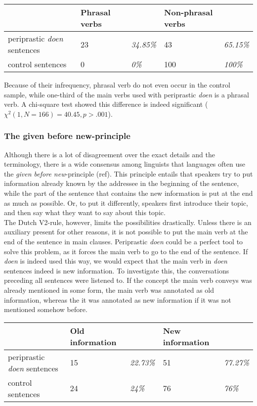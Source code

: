 \documentclass[12pt]{article}
\begin{document}

\begin{table}[h]
\begin{tabular}{|l|ll|ll|}
\hline
&Phrasal verbs&&Non-phrasal verbs&\\
\hline
periprastic \emph{doen} sentences	&23 	& \emph{34.85\%}	&43		 &\emph{65.15\%}\\
control sentences					&0		& \emph{0\%}		&100	 &\emph{100\%}\\
\hline
\end{tabular}
\end{table}

Because of their infrequency, phrasal verb do not even occur in the control sample, while one-third of the main verbs used with periprastic \emph{doen} is a phrasal verb. A chi-square test showed this difference is indeed significant ($\chi^2(1, N=166) = 40.45, p > .001$).

\subsubsection{The given before new-principle}

Although there is a lot of disagreement over the exact details and the terminology, there is a wide consensus among linguists that languages often use the \emph{given before new}-principle (ref). This principle entails that speakers try to put information already known by the addressee in the beginning of the sentence, while the part of the sentence that contains the new information is put at the end as much as possible. Or, to put it differently, speakers first introduce their topic, and then say what they want to say about this topic.\\\indent
The Dutch V2-rule, however, limits the possibilities drastically. Unless there is an auxiliary present for other reasons, it is not possible to put the main verb at the end of the sentence in main clauses. Periprastic \emph{doen} could be a perfect tool to solve this problem, as it forces the main verb to go to the end of the sentence. If \emph{doen} is indeed used this way, we would expect that the main verb in \emph{doen} sentences indeed is new information. To investigate this, the conversations preceding all sentences were listened to. If the concept the main verb conveys was already mentioned in some form, the main verb was annotated as old information, whereas the it was annotated as new information if it was not mentioned somehow before.

\begin{table}[h]
\begin{tabular}{|l|ll|ll|}
\hline
&Old information&&New information&\\
\hline
periprastic \emph{doen} sentences	&15 	& \emph{22.73\%}	&51		 &\emph{77.27\%}\\
control sentences					&24		& \emph{24\%}		&76		 &\emph{76\%}\\
\hline
\end{tabular}
\end{table}
\end{document}
